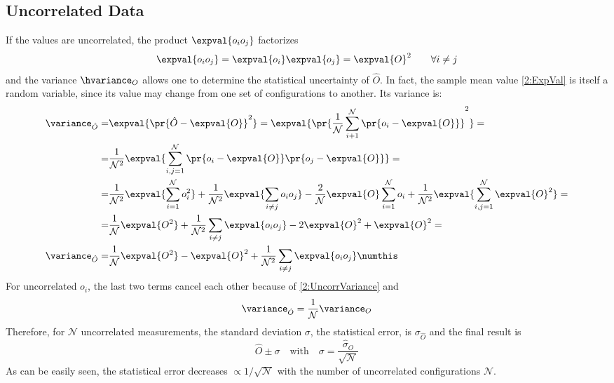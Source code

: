 \subsection{Uncorrelated Data}
If the values are uncorrelated, the product $\expval{o_io_j}$ factorizes
\begin{equation}
    \expval{o_io_j} = \expval{o_i}\expval{o_j} = \expval{O}^2 \qquad \forall i\neq j \label{2:UncorrVariance}
\end{equation}
and the variance $\hvariance_O$ allows one to determine the statistical uncertainty of $\hat{O}$.
In fact, the sample mean value \eqref{2:ExpVal} is itself a random variable, since its value may change from one set of configurations to another.
Its variance is:
\begin{align*}
    \variance_{\hat{O}} =& \expval{\pr{\hat{O}-\expval{O}}^2} = \expval{\pr{\frac1{\mathcal{N}}\sum_{i+1}^\mathcal{N}\pr{o_i-\expval{O}}}^2} = \\
    =& \frac1{\mathcal{N}^2}\expval{\sum_{i,j=1}^\mathcal{N}\pr{o_i-\expval{O}}\pr{o_j-\expval{O}}} = \\
    =& \frac1{\mathcal{N}^2}\expval{\sum_{i=1}^\mathcal{N} o_i^2} + \frac1{\mathcal{N}^2}\expval{\sum_{i\neq j}o_io_j} -\frac2{\mathcal{N}}\expval{O}\sum_{i=1}^\mathcal{N} o_i +\frac1{\mathcal{N}^2}\expval{\sum_{i,j=1}^\mathcal{N}\expval{O}^2} =\\
    =& \frac1{\mathcal{N}}\expval{O^2} +\frac1{\mathcal{N}^2}\sum_{i\neq j}\expval{o_io_j} -2\expval{O}^2 +\expval{O}^2 = \\
    \variance_{\hat{O}} =& \frac{1}{\mathcal{N}}\expval{O^2} -\expval{O}^2 +\frac1{\mathcal{N}^2}\sum_{i\neq j}\expval{o_io_j} \numthis\label{2:CorrVarMean}
\end{align*}
For uncorrelated $o_i$, the last two terms cancel each other because of \eqref{2:UncorrVariance} and
\begin{equation}
    \variance_{\hat{O}} = \frac{1}{\mathcal{N}}\variance_O \label{2:VarianceRelation}
\end{equation}
Therefore, for $\mathcal{N}$ uncorrelated measurements, the standard deviation $\sigma$, \ie the statistical error, is $\sigma_{\hat{O}}$ and the final result is
\begin{equation}
    \hat{O}\pm\sigma \quad \text{with} \quad \sigma=\frac{\hat{\sigma}_O}{\sqrt{\mathcal{N}}} \label{2:FinalMeasureUncorr}
\end{equation}
As can be easily seen, the statistical error decreases $\varpropto1/\sqrt{\mathcal{N}}$ with the number of uncorrelated configurations $\mathcal{N}$.


